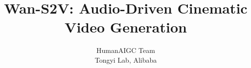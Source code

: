 \documentclass{article} %
\title{Wan-S2V: Audio-Driven Cinematic Video Generation}
\author{HumanAIGC Team\\
Tongyi Lab, Alibaba}
\begin{document}
\maketitle

\begin{abstract}

\end{abstract}
\end{document}
